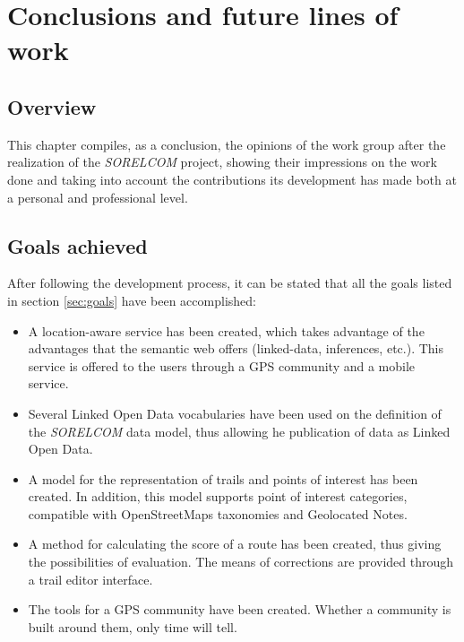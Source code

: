 \chapter{Conclusions and future lines of work}\label{ch:conclusions}

\section{Overview}

This chapter compiles, as a conclusion, the opinions of the work group after the realization of the \textit{SORELCOM} project, showing their impressions on the work done and taking into account the contributions its development has made both at a personal and professional level.

\section{Goals achieved}

After following the development process, it can be stated that all the goals listed in section \ref{sec:goals} have been accomplished:

\begin{itemize}
\item A location-aware service has been created, which takes advantage of the advantages that the semantic web offers (linked-data, inferences, etc.). This service is offered to the users through a GPS community and a mobile service.

\item Several Linked Open Data vocabularies have been used on the definition of the \textit{SORELCOM} data model, thus allowing he publication of data as Linked Open Data. 

\item A model for the representation of trails and points of interest has been created. In addition, this model supports point of interest categories, compatible with OpenStreetMaps taxonomies and Geolocated Notes.

\item A method for calculating the score of a route has been created, thus giving the possibilities of evaluation. The means of corrections are provided through a trail editor interface.

\item The tools for a GPS community have been created. Whether a community is built around them, only time will tell.

\end{itemize}

